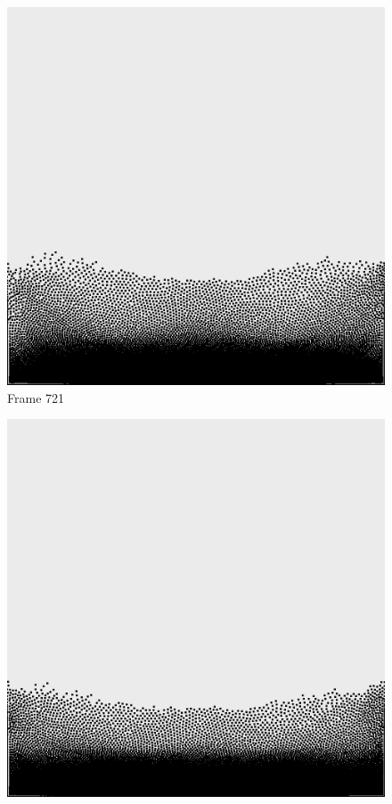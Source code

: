 \documentclass[a4paper, 12pt, oneside]{book}
\begin{document}
\begin{figure}[!ht]
    \addvspace{0.5ex}
        \begin{center}
            \includegraphics[width=\linewidth]{images/test_case_1/721.png}
            Frame 721
        \end{center}
    \endminipage
    \hfill
        \begin{center}
            \includegraphics[width=\linewidth]{images/test_case_1/741.png}

\end{center}
\end{figure}
\end{document}
